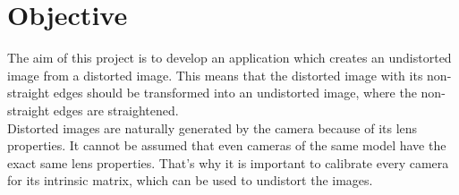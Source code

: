 \section{Objective}

The aim of this project is to develop an application which creates an undistorted image from a distorted image. This means that the distorted image with its non-straight edges should be transformed into an undistorted image, where the non-straight edges are straightened.\\ 

Distorted images are naturally generated by the camera because of its lens properties. It cannot be assumed that even cameras of the same model have the exact same lens properties. That's why it is important to calibrate every camera for its intrinsic matrix, which can be used to undistort the images. \cite{cv}\\

